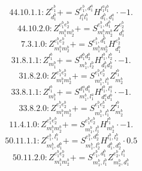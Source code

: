 \documentclass[letterpaper,10pt,fleqn,leqno,onecolumn]{article}
\begin{document}
\begin{equation} \;\;\;\;\;\;  44.10.1.1: Z^{e_{1}^{b}}_{d_{1}^{b}}+=S^{e_{1}^{b},d_{1}^{a}}_{l_{1}^{a}l_{1}^{b}}H^{l_{1}^{a}l_{1}^{b}}_{d_{1}^{b},d_{1}^{a}}\cdot -1. \end{equation}
\begin{equation} \;\;\;\;\;\;  44.10.2.0: Z^{e_{1}^{b}e_{2}^{b}}_{m_{1}^{b}m_{2}^{b}}+=S^{e_{1}^{b},d_{1}^{b}}_{m_{1}^{b}m_{2}^{b}}Z^{e_{2}^{b}}_{d_{1}^{b}} \end{equation}
\begin{equation} \;\;\;\;\;\;  7.3.1.0: Z^{e_{1}^{b}e_{2}^{b}}_{m_{1}^{b}m_{2}^{b}}+=S^{e_{1}^{b},d_{1}^{b}}_{m_{1}^{b}m_{2}^{b}}H^{e_{2}^{b}}_{d_{1}^{b}} \end{equation}
\begin{equation} \;\;\;\;\;\;  31.8.1.1: Z^{l_{1}^{b}}_{m_{1}^{b}}+=S^{d_{1}^{b}d_{2}^{b}}_{m_{1}^{b},l_{2}^{b}}H^{l_{1}^{b},l_{2}^{b}}_{d_{1}^{b}d_{2}^{b}}\cdot -1. \end{equation}
\begin{equation} \;\;\;\;\;\;  31.8.2.0: Z^{e_{1}^{b}e_{2}^{b}}_{m_{1}^{b}m_{2}^{b}}+=S^{e_{1}^{b}e_{2}^{b}}_{m_{1}^{b},l_{1}^{b}}Z^{l_{1}^{b}}_{m_{2}^{b}} \end{equation}
\begin{equation} \;\;\;\;\;\;  33.8.1.1: Z^{l_{1}^{b}}_{m_{1}^{b}}+=S^{d_{1}^{a}d_{1}^{b}}_{m_{1}^{b},l_{1}^{a}}H^{l_{1}^{b},l_{1}^{a}}_{d_{1}^{a}d_{1}^{b}}\cdot -1. \end{equation}
\begin{equation} \;\;\;\;\;\;  33.8.2.0: Z^{e_{1}^{b}e_{2}^{b}}_{m_{1}^{b}m_{2}^{b}}+=S^{e_{1}^{b}e_{2}^{b}}_{m_{1}^{b},l_{1}^{b}}Z^{l_{1}^{b}}_{m_{2}^{b}} \end{equation}
\begin{equation} \;\;\;\;\;\;  11.4.1.0: Z^{e_{1}^{b}e_{2}^{b}}_{m_{1}^{b}m_{2}^{b}}+=S^{e_{1}^{b}e_{2}^{b}}_{m_{1}^{b},l_{1}^{b}}H^{l_{1}^{b}}_{m_{2}^{b}}\cdot -1. \end{equation}
\begin{equation} \;\;\;\;\;\;  50.11.1.1: Z^{e_{1}^{b},l_{1}^{b}}_{m_{1}^{b},d_{1}^{b}}+=S^{e_{1}^{b},d_{2}^{b}}_{m_{1}^{b},l_{2}^{b}}H^{l_{1}^{b},l_{2}^{b}}_{d_{1}^{b},d_{2}^{b}}\cdot 0.5 \end{equation}
\begin{equation} \;\;\;\;\;\;  50.11.2.0: Z^{e_{1}^{b}e_{2}^{b}}_{m_{1}^{b}m_{2}^{b}}+=S^{e_{1}^{b},d_{1}^{b}}_{m_{1}^{b},l_{1}^{b}}Z^{e_{2}^{b},l_{1}^{b}}_{m_{2}^{b},d_{1}^{b}} \end{equation}
\end{document}
